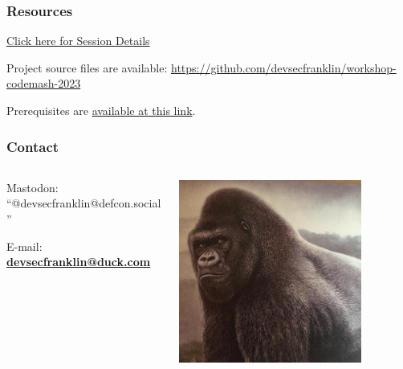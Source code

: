 \documentclass[aspectratio=169]{beamer}
\begin{document}
\begin{frame}
	\frametitle{Resources}
	\href{https://www.codemash.org/session-details/?id=375030}{Click here for Session Details}
	\vspace{2mm}
	
	Project source files are available: \url{https://github.com/devsecfranklin/workshop-codemash-2023}
	\vspace{2mm}
	
	Prerequisites are \href{https://prereqs.codemash.org/}{available at this link}.
\end{frame}

\begin{frame}
	\frametitle{Contact}
	\begin{columns}
		\begin{column}{0.5\textwidth}
 		Mastodon: ``@devsecfranklin@defcon.social''
 		\vspace{2mm}
 	
 		E-mail: \textbf{\href{mailto:devsecfranklin@duck.com}{devsecfranklin@duck.com}}
 		\end{column}
		\begin{column}{0.5\textwidth} 
		\begin{center}
			\includegraphics[width=0.785\textwidth]{../images/rilla.jpg}
		\end{center}
 		\end{column}
	\end{columns}
\end{frame}
\end{document}
